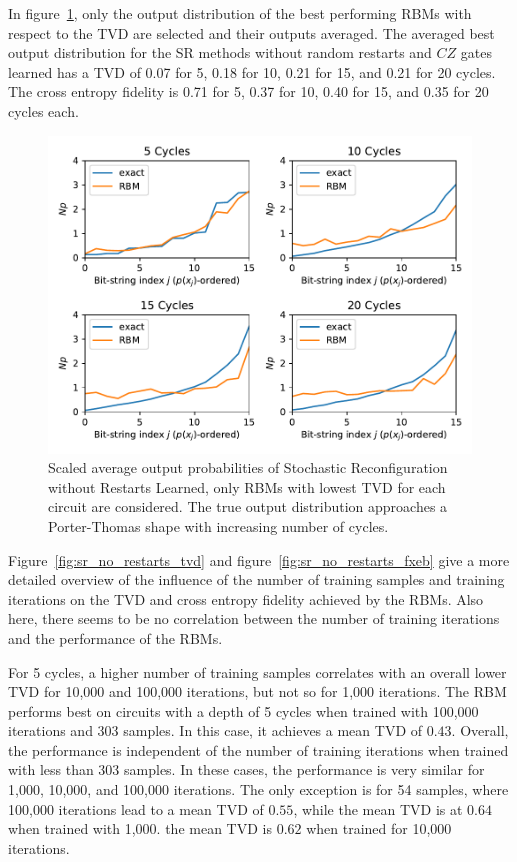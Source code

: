 In figure~\ref{fig:sr_no_restarts_bestPDF}, only the output distribution of the best performing RBMs with respect to the 
TVD are selected and their outputs averaged. The averaged best output distribution for the SR methods without 
random restarts and $CZ$ gates learned has a TVD of 0.07 for 5, 0.18 for 10, 0.21 for 15, and 0.21 for 20 
cycles. The cross entropy fidelity is 0.71 for 5, 0.37 for 10, 0.40 for 15, and 0.35 for 20 cycles each. 

\begin{figure}[H]
  \centering
  \includegraphics[width=\textwidth]{figures/results/SR-no-restarts-learned/avgBestPDF.pdf}
  \caption[Averaged best performing scaled output probabilities of Stochastic Reconfiguration without Restarts Learned]{
    Scaled average output probabilities of Stochastic Reconfiguration without Restarts Learned, only RBMs with lowest
    TVD for each circuit are considered. The true 
    output distribution approaches a Porter-Thomas shape with increasing number of cycles.}
  \label{fig:sr_no_restarts_bestPDF}
\end{figure}

Figure~\ref{fig:sr_no_restarts_tvd} and figure~\ref{fig:sr_no_restarts_fxeb} give a more detailed overview of the influence of the 
number of training samples and training iterations on the TVD and cross entropy fidelity achieved by 
the RBMs. Also here, there seems to be no correlation between the number of training
iterations and the performance of the RBMs. 

For 5 cycles, a higher number of training samples 
correlates with an overall lower TVD for 10,000 and 100,000 iterations, but not so for 1,000 iterations. The RBM performs best on 
circuits with a depth of 5 cycles when trained with 100,000 iterations and 303 samples. In this case, 
it achieves a mean TVD of $0.43$. Overall, the performance is independent of the number of 
training iterations when trained with less than 303 samples. In these cases, the performance is very 
similar for 1,000, 10,000, and 100,000 iterations. The only exception is for 54 samples, where 100,000 iterations lead to a 
mean TVD of $0.55$, while the mean TVD is at $0.64$ when trained with 1,000. the mean TVD is $0.62$ when trained for 
10,000 iterations. 

